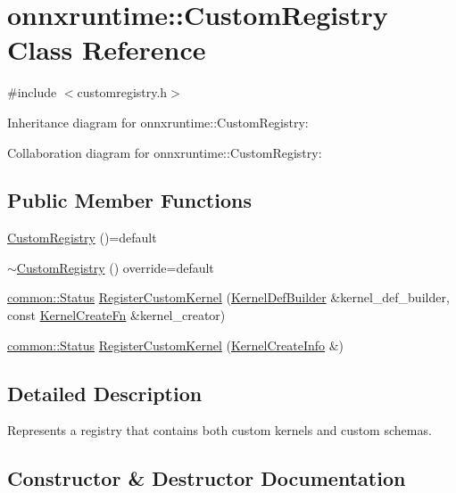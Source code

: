 \hypertarget{classonnxruntime_1_1CustomRegistry}{}\section{onnxruntime\+:\+:Custom\+Registry Class Reference}
\label{classonnxruntime_1_1CustomRegistry}


{\ttfamily \#include $<$customregistry.\+h$>$}



Inheritance diagram for onnxruntime\+:\+:Custom\+Registry\+:


Collaboration diagram for onnxruntime\+:\+:Custom\+Registry\+:
\subsection*{Public Member Functions}
\begin{DoxyCompactItemize}
\item 
\mbox{\hyperlink{classonnxruntime_1_1CustomRegistry_a0dea8240e8ae8246decbf847da832d6f}{Custom\+Registry}} ()=default
\item 
\mbox{\hyperlink{classonnxruntime_1_1CustomRegistry_aaf13ddea9c56607927b6a2e00623a1df}{$\sim$\+Custom\+Registry}} () override=default
\item 
\mbox{\hyperlink{classonnxruntime_1_1common_1_1Status}{common\+::\+Status}} \mbox{\hyperlink{classonnxruntime_1_1CustomRegistry_a577dc63a5dc382790c62341054fc39e4}{Register\+Custom\+Kernel}} (\mbox{\hyperlink{classonnxruntime_1_1KernelDefBuilder}{Kernel\+Def\+Builder}} \&kernel\+\_\+def\+\_\+builder, const \mbox{\hyperlink{namespaceonnxruntime_a2e23731e78afbe4e5e15a18493162335}{Kernel\+Create\+Fn}} \&kernel\+\_\+creator)
\item 
\mbox{\hyperlink{classonnxruntime_1_1common_1_1Status}{common\+::\+Status}} \mbox{\hyperlink{classonnxruntime_1_1CustomRegistry_ab931a32b12dd5193f5354f1f89b6e10f}{Register\+Custom\+Kernel}} (\mbox{\hyperlink{structonnxruntime_1_1KernelCreateInfo}{Kernel\+Create\+Info}} \&)
\end{DoxyCompactItemize}


\subsection{Detailed Description}
Represents a registry that contains both custom kernels and custom schemas. 

\subsection{Constructor \& Destructor Documentation}
\mbox{\label{classonnxruntime_1_1CustomRegistry_a0dea8240e8ae8246decbf847da832d6f}} 
